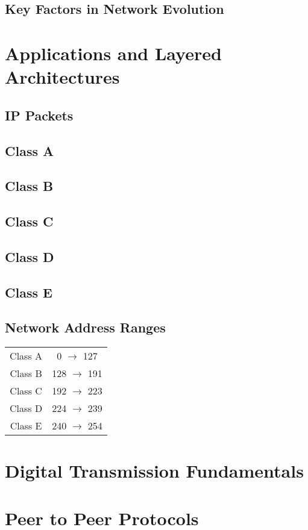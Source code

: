 \documentclass[11pt]{article}
\begin{document}
\subsection{Key Factors in Network Evolution}
\section{Applications and Layered Architectures}
\subsection{IP Packets}

\subsection{Class A}
\subsection{Class B}
\subsection{Class C}
\subsection{Class D} 
\subsection{Class E}

\subsection{Network Address Ranges}
\begin{center}
    \begin{tabular}{ |c c| } 
     Class A & 0 $\rightarrow$ 127  \\ 
     Class B & 128 $\rightarrow$ 191  \\ 
     Class C & 192 $\rightarrow$ 223  \\ 
     Class D & 224 $\rightarrow$ 239  \\ 
     Class E & 240 $\rightarrow$ 254  
    \end{tabular}
\end{center}
\section{Digital Transmission Fundamentals}
\section{Peer to Peer Protocols}


    
\end{document}
